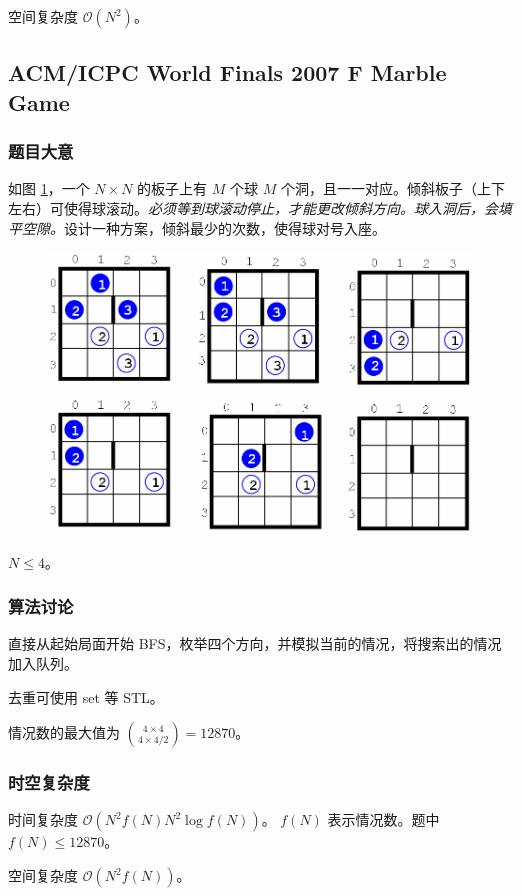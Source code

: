 				空间复杂度 $\mathcal{O}\left(N^2\right)$。
		\newpage
					
	
		\subsection{ACM/ICPC World Finals 2007 F Marble Game}
			\subsubsection{题目大意}
			如图 \ref{2007f}，一个 $N \times N$ 的板子上有 $M$ 个球 $M$ 个洞，且一一对应。倾斜板子（上下左右）可使得球滚动。\emph{必须等到球滚动停止，才能更改倾斜方向。球入洞后，会填平空隙。}设计一种方案，倾斜最少的次数，使得球对号入座。
				\begin{figure}[htb]
					\centering
					\includegraphics[width=0.7 \textwidth]{2007f.png}
					\caption{} \label{2007f}
				\end{figure}
			
			$N \le 4$。 
			
			\subsubsection{算法讨论}
				直接从起始局面开始 BFS，枚举四个方向，并模拟当前的情况，将搜索出的情况加入队列。
				
				去重可使用 set 等 STL。
				
				情况数的最大值为 $\binom{4 \times 4}{4 \times 4 / 2} = 12870$。
				
			\subsubsection{时空复杂度}
				时间复杂度 $\mathcal{O}\left(N^2f(N) N^2\log f(N)\right)$。 $f(N)$ 表示情况数。题中 $f(N) \le 12870$。
					
				空间复杂度 $\mathcal{O}\left(N^2f(N)\right)$。
				
